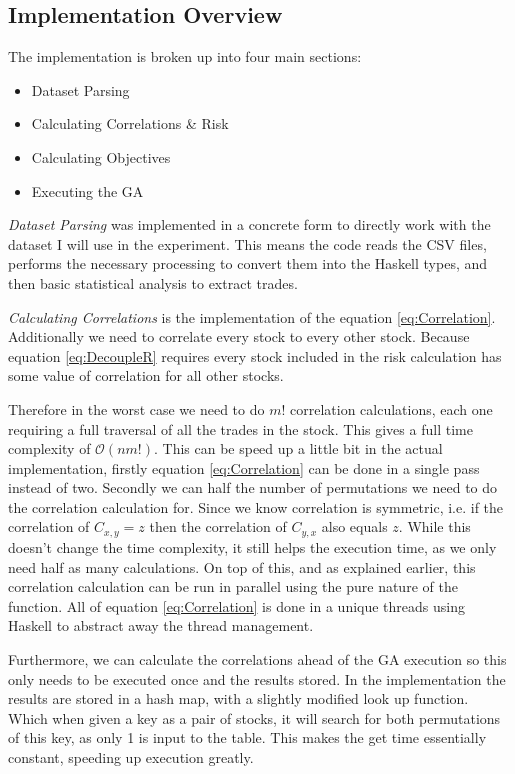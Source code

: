 \documentclass[11pt]{article}
\newcommand{\bigO}{\mathcal{O}}
\begin{document}
\subsection{Implementation Overview}

    The implementation is broken up into four main sections:

    \begin{itemize}
        \item{Dataset Parsing}
        \item{Calculating Correlations \& Risk}
        \item{Calculating Objectives}
        \item{Executing the GA}
    \end{itemize}

    \textit{Dataset Parsing} was implemented in a concrete form to directly work with the
    dataset I will use in the experiment. This means the code reads the CSV files,
    performs the necessary processing to convert them into the Haskell types, and then
    basic statistical analysis to extract trades.

    \textit{Calculating Correlations} is the implementation of the equation \ref{eq:Correlation}.
    Additionally we need to correlate every stock to every other stock. Because equation
    \ref{eq:DecoupleR} requires every stock included in the risk calculation has some value of
    correlation for all other stocks.

    Therefore in the worst case we need to do \(m!\) correlation calculations, each one requiring a
    full traversal of all the trades in the stock. This gives a full time complexity of 
    \(\bigO (nm!) \). This can be speed up a little bit in the actual implementation, firstly
    equation \ref{eq:Correlation} can be done in a single pass instead of two. Secondly we can
    half the number of permutations we need to do the correlation calculation for. Since we know
    correlation is symmetric, i.e. if the correlation of \(C_{x,y} = z\) then the correlation
    of \(C_{y,x}\) also equals \(z\). While this doesn't change the time complexity, it still helps
    the execution time, as we only need half as many calculations. On top of this, and as explained
    earlier, this correlation calculation can be run in parallel using the pure nature of the function.
    All of equation \ref{eq:Correlation} is done in a unique threads using Haskell to abstract away
    the thread management.

    Furthermore, we can calculate the correlations ahead of the GA execution so this only needs to be
    executed once and the results stored. In the implementation the results are stored in a hash map,
    with a slightly modified look up function. Which when given a key as a pair of stocks, it will
    search for both permutations of this key, as only 1 is input to the table. This makes the
    get time essentially constant, speeding up execution greatly.
\end{document}
